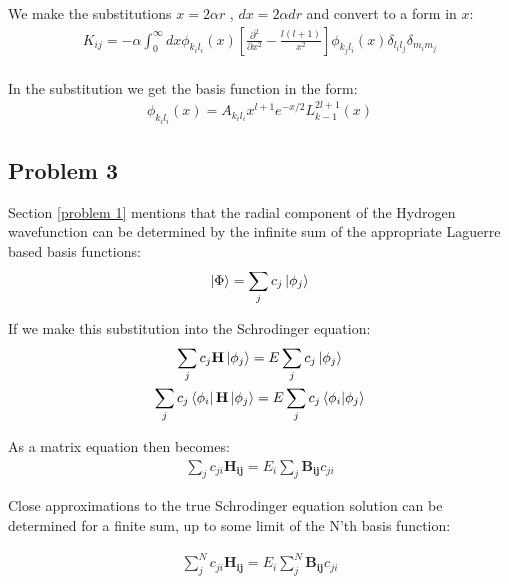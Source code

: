 \documentclass{article}
\renewcommand{\vec}[1]{\mathbf{#1}}
\begin{document}
    We make the substitutions $x=2\alpha r$ , $dx=2\alpha dr$ and convert to a form in $x$:
    \large
    \begin{gather}
    	K_{ij} = -\alpha\int_{0}^{\infty} dx \phi_{k_il_i}(x) \left[\frac{\partial^2}{\partial x^2} -\frac{l(l+1)}{x^2}\right] \phi_{k_jl_i}(x) \delta_{l_il_j} \delta_{m_im_j}\\
    \end{gather}
    \normalsize
    
    In the substitution we get the basis function in the form:
    \large
    \begin{gather}
    	\phi_{k_il_i}(x) = A_{k_il_i} x^{l+1} e^{-x/2} L^{2l+1}_{k-1}(x)
    \end{gather}   
    \normalsize
    
    
    


 
    
    \subsection{Problem 3}
    
    
    Section \ref{problem 1} mentions that the radial component of the Hydrogen wavefunction can be determined by the infinite sum of the appropriate Laguerre based basis functions:
    \large
    \begin{gather}
    	\ket{\Phi} = \sum_{j}c_j\ket{\phi_j}
    \end{gather}
    \normalsize
    
    If we make this substitution into the Schrodinger equation:
    \large
    \begin{gather}
    	\sum_{j}c_j\vec{H}\ket{\phi_j} = E\sum_{j}c_j\ket{\phi_j}\\
    	\sum_{j}c_j\bra{\phi_i}\vec{H}\ket{\phi_j} = E\sum_{j}c_j\bra{\phi_i}\ket{\phi_j}
    \end{gather}
    \normalsize
    
    As a matrix equation then becomes:
    \large
    \begin{gather}
    	\sum_{j}c_{ji}\vec{H_{ij}} = E_i\sum_{j}\vec{B_{ij}}c_{ji}
    \end{gather}
    \normalsize


    Close approximations to the true Schrodinger equation solution can be determined for a finite sum, up to some limit of the N'th basis function:
    
	\large
	\begin{gather}
		\sum_{j}^{N}c_{ji}\vec{H_{ij}} = E_i\sum_{j}^{N}\vec{B_{ij}}c_{ji}
	\end{gather}
	\normalsize
	
\end{document}
